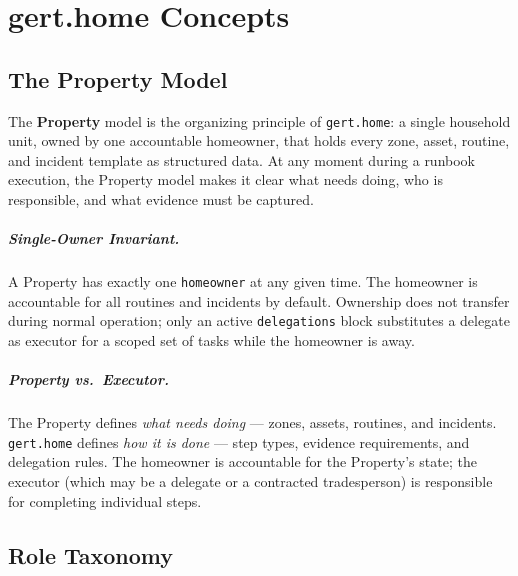 \chapter{gert.home Concepts}
\label{ch:concepts}

\section{The Property Model}
\label{sec:concepts-model}

The \textbf{Property} model is the organizing principle of \texttt{gert.home}: a single
household unit, owned by one accountable homeowner, that holds every zone, asset, routine,
and incident template as structured data. At any moment during a runbook execution, the
Property model makes it clear what needs doing, who is responsible, and what evidence must
be captured.

\paragraph{Single-Owner Invariant.}
A Property has exactly one \texttt{homeowner} at any given time. The homeowner is accountable
for all routines and incidents by default. Ownership does not transfer during normal operation;
only an active \texttt{delegations} block substitutes a delegate as executor for a scoped
set of tasks while the homeowner is away.

\paragraph{Property vs.\ Executor.}
The Property defines \emph{what needs doing} --- zones, assets, routines, and incidents.
\texttt{gert.home} defines \emph{how it is done} --- step types, evidence requirements, and
delegation rules. The homeowner is accountable for the Property's state; the executor (which
may be a delegate or a contracted tradesperson) is responsible for completing individual steps.

\section{Role Taxonomy}
\label{sec:concepts-roles}

